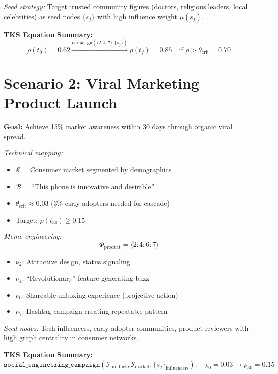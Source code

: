 \documentclass[11pt,twoside]{book}
\theoremstyle{definition}
\theoremstyle{plain}
\theoremstyle{remark}
\newcommand{\noe}[1]{\nu_{#1}}
\newcommand{\Frac}{\Phi}
\begin{document}
\begin{tcolorbox}[colback=yellow!5!white,colframe=yellow!65!black,title=\textbf{Scenario: Vaccination Campaign Design},breakable]
\textit{Seed strategy:} Target trusted community figures (doctors, religious leaders, local celebrities) as seed nodes $\{s_j\}$ with high influence weight $\mu(s_j)$.

\textbf{TKS Equation Summary:}
\begin{equation}
\boxed{
    \rho(t_0) = 0.62 \xrightarrow{\mathtt{campaign}(\langle 2:4:7 \rangle, \{s_j\})}
    \rho(t_f) = 0.85 \quad \text{if } \rho > \theta_{\mathrm{crit}} = 0.70
}
\end{equation}

\end{tcolorbox}

\section{Scenario 2: Viral Marketing --- Product Launch}

\begin{tcolorbox}[colback=yellow!5!white,colframe=yellow!65!black,title=\textbf{Scenario: Viral Product Launch},breakable]

\textbf{Goal:} Achieve 15\% market awareness within 30 days through organic viral spread.

\textit{Technical mapping:}
\begin{itemize}
    \item $\mathcal{S}$ = Consumer market segmented by demographics
    \item $\mathcal{B}$ = ``This phone is innovative and desirable''
    \item $\theta_{\mathrm{crit}} \approx 0.03$ (3\% early adopters needed for cascade)
    \item Target: $\rho(t_{30}) \geq 0.15$
\end{itemize}

\textit{Meme engineering:}
\[
    \Frac_{\mathrm{product}} = \langle 2:4:6:7 \rangle
\]
\begin{itemize}
    \item $\noe{2}$: Attractive design, status signaling
    \item $\noe{4}$: ``Revolutionary'' feature generating buzz
    \item $\noe{6}$: Shareable unboxing experience (projective action)
    \item $\noe{7}$: Hashtag campaign creating repeatable pattern
\end{itemize}

\textit{Seed nodes:} Tech influencers, early-adopter communities, product reviewers with high graph centrality in consumer networks.

\textbf{TKS Equation Summary:}
\begin{equation}
\boxed{
    \mathtt{social\_engineering\_campaign}(\mathcal{I}_{\mathrm{product}}, \mathcal{S}_{\mathrm{market}}, \{s_j\}_{\mathrm{influencers}})
    : \quad \rho_0 = 0.03 \to \rho_{30} = 0.15
}
\end{equation}

\end{tcolorbox}
\end{document}
